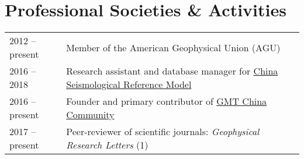 \section*{Professional Societies \& Activities}

\begin{tabular}{ll}
2012 -- present & Member of the American Geophysical Union (AGU) \\
2016 -- 2018    & Research assistant and database manager for \href{http://chinageorefmodel.org/}{China Seismological Reference Model} \\
2016 -- present & Founder and primary contributor of \href{http://gmt-china.org/}{GMT China Community} \\
2017 -- present & Peer-reviewer of scientific journals: \textit{Geophysical Research Letters} (1) \\
\end{tabular}
